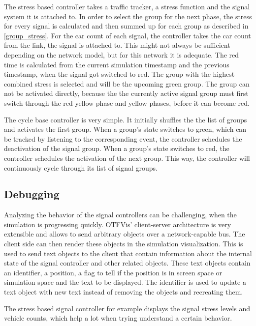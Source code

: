 The stress based controller takes a traffic tracker, a stress function and the signal system it is attached to. In order to select the group for the next phase, the stress for every signal is calculated and then summed up for each group as described in \autoref{group_stress}. For the car count of each signal, the controller takes the car count from the link, the signal is attached to. This might not always be sufficient depending on the network model, but for this network it is adequate. The red time is calculated from the current simulation timestamp and the previous timestamp, when the signal got switched to red. The group with the highest combined stress is selected and will be the upcoming green group. The group can not be activated directly, because the the currently active signal group must first switch through the red-yellow phase and yellow phases, before it can become red.

The cycle base controller is very simple. It initially shuffles the the list of groups and activates the first group. When a group's state switches to green, which can be tracked by listening to the corresponding event, the controller schedules the deactivation of the signal group. When a group's state switches to red, the controller schedules the activation of the next group. This way, the controller will continuously cycle through its list of signal groups.

\subsection{Debugging}

Analyzing the behavior of the signal controllers can be challenging, when the simulation is progressing quickly. OTFVis' client-server architecture is very extensible and allows to send arbitrary objects over a network-capable bus. The client side can then render these objects in the simulation visualization. This is used to send text objects to the client that contain information about the internal state of the signal controller and other related objects. These text objects contain an identifier, a position, a flag to tell if the position is in screen space or simulation space and the text to be displayed. The identifier is used to update a text object with new text instead of removing the objects and recreating them.

The stress based signal controller for example displays the signal stress levels and vehicle counts, which help a lot when trying understand a certain behavior.


